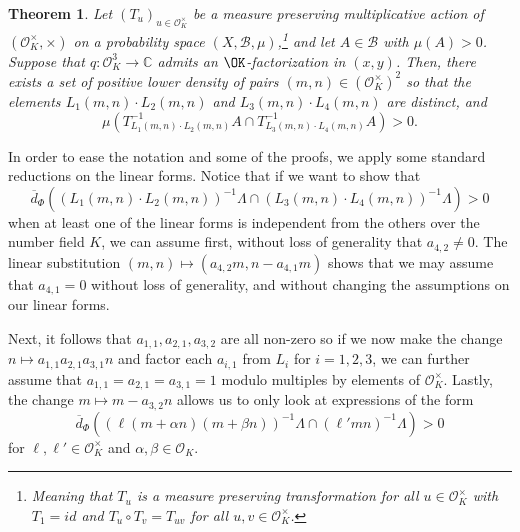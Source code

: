\documentclass[11pt]{amsart}
\newtheorem{theorem}[lemma]{Theorem}
\theoremstyle{definition}
\newcommand{\C}{{\mathbb C}}
\newcommand{\WS}[1]{{\color{blue}{{#1}}}}
\newcommand{\AK}[1]{{\color{ForestGreen}{{#1}}}}
\begin{document}
\iffalse
\begin{theorem}\label{firstreduction}
Let $(T_u)_{u \in\mathcal{O}_K^{\times}}$ be a measure preserving multiplicative action of $(\mathcal{O}_K^{\times},\times)$ on a probability space $(X,\mathcal{B},\mu)$,\footnote{Meaning that $T_{u}$ is a measure preserving transformation for all $u \in\mathcal{O}_K^{\times}$ with $T_{1}=id$ and $T_{u}\circ T_{v}=T_{uv}$ for all $u,v\in\mathcal{O}_K^{\times}$.} and let $A \in \mathcal{B}$ with $\mu(A)>0$. Suppose that $q: \mathcal{O}_K^3 \to \C$ admits an $\OK$-factorization in $(x,y)$. Then, there exists a set of positive lower density of pairs $(m,n)\in (\mathcal{O}_K^{\times})^2$ \WS{not defined} so that the elements $ L_1(m,n)\cdot L_2(m,n)$ and $L_3(m,n)\cdot L_4(m,n)$ are distinct, and
\begin{equation}\label{measurerec1}
\mu(T_{L_1(m,n)\cdot L_2(m,n)}^{-1}A \cap T_{L_3(m,n)\cdot L_4(m,n)}^{-1}A)>0.
\end{equation}
\end{theorem}

 
In order to ease the notation and some of the proofs, we apply some standard reductions on the linear forms. Notice that if we want to show that
\[
\overline{d}_{\Phi}((L_1(m,n)\cdot L_2(m,n))^{-1}\Lambda \cap (L_3(m,n)\cdot L_4(m,n))^{-1} \Lambda)>0
\]
when at least one of the linear forms is independent from the others over the number field $K$, we can assume first, without loss of generality that $a_{4,2} \neq 0$.  The linear substitution $(m,n) \mapsto (a_{4,2}m,n-a_{4,1}m)$ shows that we may assume that $a_{4,1}=0$ without loss of generality, and without changing the assumptions on our linear forms. 

Next, it follows that $a_{1,1},a_{2,1},a_{3,2}$ are all non-zero so if we now make the change $n \mapsto a_{1,1}a_{2,1}a_{3,1} n$ and factor each $a_{i,1}$ from $L_i$ for $i=1,2,3$, we can further assume that $a_{1,1}=a_{2,1}=a_{3,1}=1$ modulo multiples by elements of $\mathcal{O}_K^{\times}$. Lastly, the change $m \mapsto m-a_{3,2}n$ allows us to only look at expressions of the form
\[
\overline{d}_{\Phi}((\ell(m+\alpha n)(m+\beta n))^{-1}\Lambda \cap (\ell'mn)^{-1} \Lambda)>0
\]
for $\ell, \ell' \in \mathcal{O}_K^{\times}$ and $\alpha,\beta \in \mathcal{O}_K$.
\end{document}
